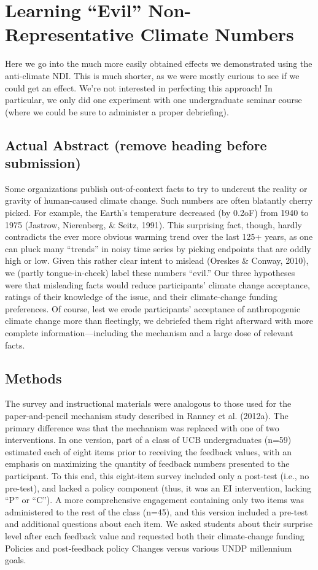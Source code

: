 \graphicspath{{evil-ndi/}}

\chapter{Learning ``Evil'' Non-Representative Climate Numbers}
\label{chap:evilndi}

Here we go into the much more easily obtained effects we demonstrated using the
anti-climate NDI. This is much shorter, as we were mostly curious to see if we
could get an effect. We're not interested in perfecting this approach! In
particular, we only did one experiment with one undergraduate seminar course
(where we could be sure to administer a proper debriefing).

\section{Actual Abstract (remove heading before submission)}

Some organizations publish out-of-context facts to try to undercut the reality
or gravity of human-caused climate change. Such numbers are often blatantly
cherry picked. For example, the Earth’s temperature decreased (by 0.2oF) from
1940 to 1975 (Jastrow, Nierenberg, \& Seitz, 1991). This surprising fact, though,
hardly contradicts the ever more obvious warming trend over the last 125+ years,
as one can pluck many ``trends'' in noisy time series by picking endpoints that
are oddly high or low. Given this rather clear intent to mislead (Oreskes \&
Conway, 2010), we (partly tongue-in-cheek) label these numbers ``evil.'' Our three
hypotheses were that misleading facts would reduce participants’ climate change
acceptance, ratings of their knowledge of the issue, and their climate-change
funding preferences. Of course, lest we erode participants’ acceptance of
anthropogenic climate change more than fleetingly, we debriefed them right
afterward with more complete information––including the mechanism and a large
dose of relevant facts.

\section{Methods} The survey and instructional materials were analogous to those used for
the paper-and-pencil mechanism study described in Ranney et al. (2012a). The
primary difference was that the mechanism was replaced with one of two
interventions. In one version, part of a class of UCB undergraduates (n=59)
estimated each of eight items prior to receiving the feedback values, with an
emphasis on maximizing the quantity of feedback numbers presented to the
participant. To this end, this eight-item survey included only a post-test
(i.e., no pre-test), and lacked a policy component (thus, it was an EI
intervention, lacking ``P'' or ``C''). A more comprehensive engagement containing
only two items was administered to the rest of the class (n=45), and this
version included a pre-test and additional questions about each item. We asked
students about their surprise level after each feedback value and requested both
their climate-change funding Policies and post-feedback policy Changes versus
various UNDP millennium goals.

